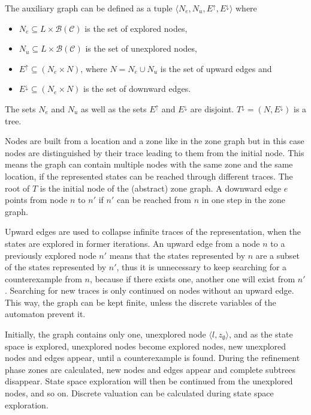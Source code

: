 \begin{runningExample}
\begin{dfn}
	The auxiliary graph can be defined as a tuple $\langle N_e, N_u, E^\uparrow, E^\downarrow \rangle$ where
	\begin{itemize}
		\item $N_e \subseteq L \times \mathcal{B}(\mathcal{C})$ is the set of explored nodes,
		\item $N_u \subseteq L \times \mathcal{B}(\mathcal{C})$  is the set of unexplored nodes,
		\item $E^\uparrow \subseteq (N_e \times N)$, where $N = N_e \cup N_u$ is the set of upward edges and
		\item $E^\downarrow \subseteq (N_e \times N)$  is the set of downward edges.
	\end{itemize}
	 The sets $N_e$ and $N_u$ as well as the sets $E^\uparrow$ and $E^\downarrow$ are disjoint. $T^\downarrow=(N,E^\downarrow)$ is a tree.
\end{dfn}
 
Nodes are built from a location and a zone like in the zone graph but in this case nodes are distinguished by their trace leading to them from the initial node. This means the graph can contain multiple nodes with the same zone and the same location, if the represented states can be reached through different traces. The root of $T$ is the initial node of the (abstract) zone graph. A downward edge $e$ points from node $n$ to $n'$ if $n'$ can be reached from $n$ in one step in the zone graph. %

Upward edges are used to collapse infinite traces of the representation, when the states are explored in former iterations. An upward edge from a node $n$ to a previously explored node $n'$ means that the states
represented by $n$ are a subset of the states represented by $n'$, thus it is unnecessary to keep searching for a
counterexample from $n$, because if there exists one, another one will exist
from $n'$. Searching for new traces is only continued on nodes without an upward edge. This way, the graph can be kept finite, unless the discrete variables of the automaton prevent it.

Initially, the graph contains only one, unexplored node $\langle l, z_{\emptyset} \rangle$, and as the state space is explored, unexplored nodes become explored nodes, new unexplored nodes and edges appear, until a counterexample is found. During the refinement phase zones are calculated, new nodes and edges appear and complete subtrees disappear. State space exploration will then be continued from the unexplored nodes, and so on. Discrete valuation can be calculated during state space exploration.


\end{runningExample}
